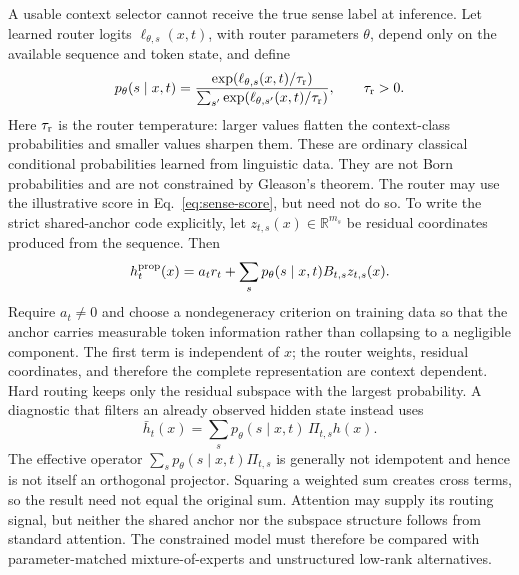 \documentclass[
  aps,
  reprint,
  superscriptaddress,
  floatfix,
  nofootinbib,
  longbibliography
]{revtex4-2}
\newcommand{\R}{\mathbb{R}}
\begin{document}
A usable context selector cannot receive the true sense label at inference.
Let learned router logits $\ell_{\theta,s}(x,t)$, with router parameters
$\theta$, depend only on the available
sequence and token state, and define
%
\begin{equation}
\label{eq:context-temp}
p_\theta(s\mid x,t)=
\frac{\exp(\ell_{\theta,s}(x,t)/\tau_{\rm r})}
{\sum_{s'}\exp(\ell_{\theta,s'}(x,t)/\tau_{\rm r})},
\qquad \tau_{\rm r}>0 .
\end{equation}
%
Here $\tau_{\rm r}$ is the router temperature: larger values flatten the
context-class probabilities and smaller values sharpen them.  These are ordinary
classical conditional probabilities learned from linguistic data.  They are
not Born probabilities and are not constrained by Gleason's theorem.
The router may use the illustrative score in Eq.~\eqref{eq:sense-score}, but
need not do so.  To write the strict shared-anchor code explicitly, let
$z_{t,s}(x)\in\R^{m_s}$ be residual coordinates produced from the sequence.
Then
%
\begin{equation}
\label{eq:shared-anchor-code}
h_t^{\rm prop}(x)=a_t r_t+
\sum_s p_\theta(s\mid x,t)B_{t,s}z_{t,s}(x).
\end{equation}
%
Require $a_t\ne0$ and choose a nondegeneracy criterion on training data so that
the anchor carries measurable token information rather than collapsing to a
negligible component.  The first term is independent of $x$; the router weights, residual coordinates,
and therefore the complete representation are context dependent.  Hard routing
keeps only the residual subspace with the largest probability.  A diagnostic that filters
an already observed hidden state instead uses
%
\begin{equation}
\label{eq:soft-context-filter}
\bar h_t(x)=\sum_s p_\theta(s\mid x,t)\,\Pi_{t,s}h(x).
\end{equation}
%
The effective operator
$\sum_s p_\theta(s\mid x,t)\Pi_{t,s}$ is generally not idempotent and hence is
not itself an orthogonal projector.  Squaring a weighted sum creates cross
terms, so the result need not equal the original sum.  Attention may supply its routing signal,
but neither the shared anchor nor the subspace structure follows from standard
attention.  The constrained model must therefore be compared with
parameter-matched mixture-of-experts and unstructured low-rank alternatives.
\end{document}
